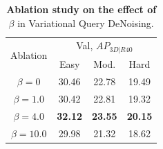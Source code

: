 \begin{table}[h!]
    \centering
    \caption{\textbf{Ablation study on the effect of $\beta$} in Variational Query DeNoising.}
    \begin{tabular}{c|ccc}
         \toprule
         \multirow{2}{*}{Ablation} & \multicolumn{3}{c}{Val, $AP_{3D|R40}$} \\
          & Easy & Mod. & Hard \\ \midrule \midrule
          $\beta=0$ & 30.46 & 22.78 & 19.49 \\
          $\beta = 1.0$ & 30.42 & 22.81 & 19.32 \\
          $\beta = 4.0$ & \textbf{32.12} & \textbf{23.55} & \textbf{20.15} \\
          $\beta = 10.0$ & 29.98 & 21.32 & 18.62 \\
         \bottomrule
    \end{tabular}
    \label{tab:beta_vdn_ablation}
\end{table}